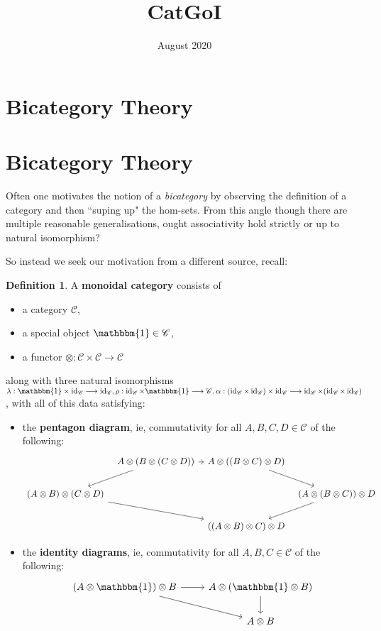 \documentclass[12pt]{article}
\title{CatGoI}
\date{August 2020}
\theoremstyle{plain}
\theoremstyle{definition}
\newtheorem{defn}[thm]{Definition} %
\newcommand{\scr}[1]{\mathscr{#1}}
\newcommand{\lto}{\longrightarrow}
\begin{document}
\section{Bicategory Theory}
\section{Bicategory Theory}
Often one motivates the notion of a \emph{bicategory} by observing the definition of a category and then ``suping up" the hom-sets. From this angle though there are multiple reasonable generalisations, ought associativity hold strictly or up to natural isomorphism?

So instead we seek our motivation from a different source, recall:
\begin{defn}
A \textbf{monoidal category} consists of
\begin{itemize}
\item a category $\scr{C}$,
\item a special object $\mathbbm{1} \in \scr{C}$,
\item a functor $\otimes: \scr{C} \times \scr{C} \lto \scr{C}$
\end{itemize}
along with three natural isomorphisms $\lambda: \mathbbm{1} \times \operatorname{id}_{\scr{C}} \lto \operatorname{id}_{\scr{C}}, \rho: \operatorname{id}_{\scr{C}} \times \mathbbm{1} \lto \operatorname{\scr{C}}, \alpha: (\operatorname{id}_{\scr{C}} \times \operatorname{id}_{\scr{C}}) \times \operatorname{id}_{\scr{C}} \lto \operatorname{id}_{\scr{C}} \times (\operatorname{id}_{\scr{C}} \times \operatorname{id}_{\scr{C}})$,
with all of this data satisfying:
\begin{itemize}
\item the \textbf{pentagon diagram}, ie, commutativity for all $A,B,C,D \in \scr{C}$ of the following:
\begin{equation}
\begin{tikzcd}[column sep = tiny]
& A \otimes (B \otimes (C \otimes D))\arrow[r]\arrow[dl]  & A \otimes ((B \otimes C) \otimes D)\arrow[dr] \\
(A \otimes B) \otimes (C \otimes D)\arrow[drr]& & & (A \otimes (B \otimes C)) \otimes D\arrow[dl]\\
& & ((A \otimes B) \otimes C) \otimes D
\end{tikzcd}
\end{equation}
\item the \textbf{identity diagrams}, ie, commutativity for all $A,B,C \in \scr{C}$ of the following:
\begin{equation}
\begin{tikzcd}
(A \otimes \mathbbm{1}) \otimes B\arrow[r]\arrow[dr] & A \otimes (\mathbbm{1} \otimes B)\arrow[d]\\
& A \otimes B
\end{tikzcd}
\end{equation}
\end{itemize}
\end{defn}
\end{document}
